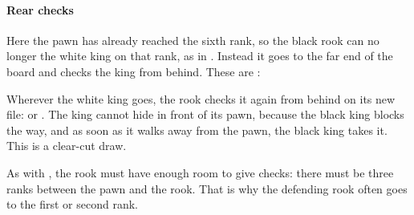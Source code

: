 \paragraph{Rear checks}


Here the pawn has already reached the sixth rank, so the black rook can no longer
 the white king on that rank, as in . Instead it goes to the
far end of the board and checks the king from behind. These are
:


Wherever the white king goes, the rook checks it again from behind on its new file:
 or . The king cannot hide in front of its pawn,
because the black king blocks the way, and as soon as it walks away from the pawn, the black king
takes it. This is a clear-cut draw.

As with , the rook must have enough room to give checks: there must be three
ranks between the pawn and the rook. That is why the defending rook often goes to the first or
second rank.
